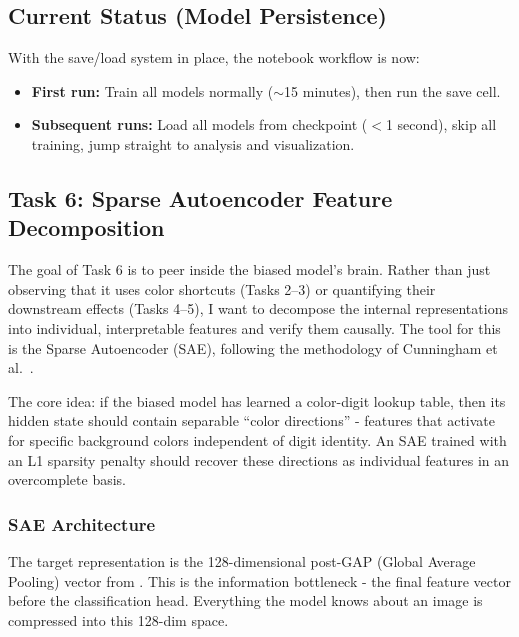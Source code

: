 \documentclass[9pt,a4paper,twocolumn,twoside]{tau-class/tau}
\begin{document}
    \subsection{Current Status (Model Persistence)}

        With the save/load system in place, the notebook workflow is now:
        \begin{itemize}
            \item \textbf{First run:} Train all models normally ($\sim$15 minutes), then run the save cell.
            \item \textbf{Subsequent runs:} Load all models from checkpoint ($<$1 second), skip all training, jump straight to analysis and visualization.
        \end{itemize}

    \subsection{Task 6: Sparse Autoencoder Feature Decomposition}

        The goal of Task 6 is to peer inside the biased model's brain. Rather than just observing that it uses color shortcuts (Tasks 2--3) or quantifying their downstream effects (Tasks 4--5), I want to decompose the internal representations into individual, interpretable features and verify them causally. The tool for this is the Sparse Autoencoder (SAE), following the methodology of Cunningham et al.\ \cite{cunningham2023sparse}.

        The core idea: if the biased model has learned a color-digit lookup table, then its hidden state should contain separable ``color directions'' - features that activate for specific background colors independent of digit identity. An SAE trained with an L1 sparsity penalty should recover these directions as individual features in an overcomplete basis.

        \subsubsection{SAE Architecture}

            The target representation is the 128-dimensional post-GAP (Global Average Pooling) vector from . This is the information bottleneck - the final feature vector before the classification head. Everything the model knows about an image is compressed into this 128-dim space.
\end{document}
